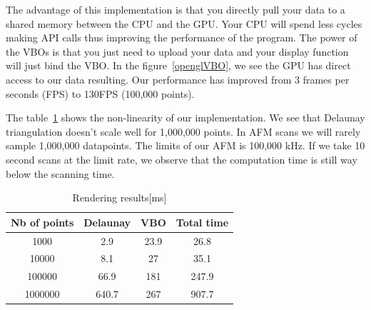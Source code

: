 The advantage of this implementation is that you directly pull your data to a shared memory between the CPU and the GPU. Your CPU will spend less cycles making API calls thus improving the performance of the program. The power of the VBOs is that you just need to upload your data and your display function will just bind the VBO. In the figure~\ref{openglVBO}, we see the GPU has direct access to our data resulting. Our performance has improved from 3 frames per seconds (FPS) to 130FPS (100,000 points). 

The table~\ref{table:nonlin} shows the non-linearity of our implementation. We see that Delaunay triangulation doesn't scale well for 1,000,000 points. In AFM scans we will rarely sample 1,000,000 datapoints. The limits of our AFM is 100,000 kHz. If we take 10 second scans at the limit rate, we observe that the computation time is still way below the scanning time. 

\begin{table}[ht]
\caption{Rendering results[ms]} %
\centering %
\begin{tabular}{c |c c| c } %
\hline\hline %
 Nb of points & Delaunay & VBO & Total time\\ [0.5ex] %
\hline %

1000 & 2.9 & 23.9 & 26.8 \\
10000 & 8.1	&	27 	& 35.1\\
100000 & 66.9 & 181 & 247.9 \\
1000000 & 640.7	& 267 & 907.7\\[1ex]


\hline %
\end{tabular}
\label{table:nonlin} %
\end{table}


